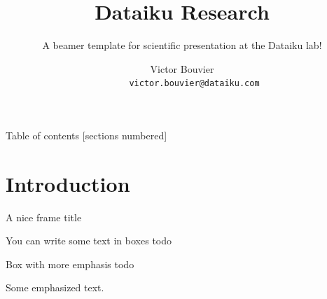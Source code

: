 \documentclass[10pt]{beamer}
\title{Dataiku Research}
\subtitle{A beamer template for scientific presentation at the Dataiku lab!}
\date{}
\author{Victor Bouvier\\~~~~~{\tiny{\texttt{victor.bouvier@dataiku.com}}}}
\institute{Dataiku Lab}
\begin{document}
\maketitle

\begin{frame}{Table of contents}
  [sections numbered]
  \tableofcontents%
\end{frame}

\section[Intro]{Introduction}

\begin{frame}{A nice frame title}

  \begin{exampleblock}{You can write some text in boxes}
      todo
    \end{exampleblock}
    
    \begin{alertblock}{Box with more emphasis}
      todo
    \end{alertblock}
    
    \alert{Some emphasized text.}
  
\end{frame}
\end{document}

